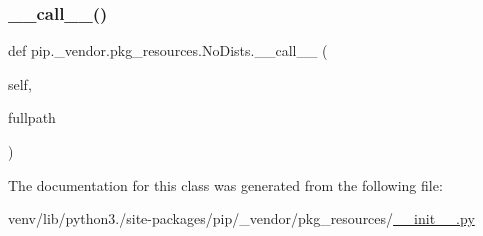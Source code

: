 \mbox{\label{classpip_1_1__vendor_1_1pkg__resources_1_1NoDists_a185e353c7e4a7625ecbc268158a3c167}} 
\subsubsection{\texorpdfstring{\+\_\+\+\_\+call\+\_\+\+\_\+()}{\_\_call\_\_()}}
{\footnotesize\ttfamily def pip.\+\_\+vendor.\+pkg\+\_\+resources.\+No\+Dists.\+\_\+\+\_\+call\+\_\+\+\_\+ (\begin{DoxyParamCaption}\item[{}]{self,  }\item[{}]{fullpath }\end{DoxyParamCaption})}



The documentation for this class was generated from the following file\+:\begin{DoxyCompactItemize}
\item 
venv/lib/python3./site-\/packages/pip/\+\_\+vendor/pkg\+\_\+resources/\hyperlink{venv_2lib_2python3_89_2site-packages_2pip_2__vendor_2pkg__resources_2____init_____8py}{\+\_\+\+\_\+init\+\_\+\+\_\+.\+py}\end{DoxyCompactItemize}
